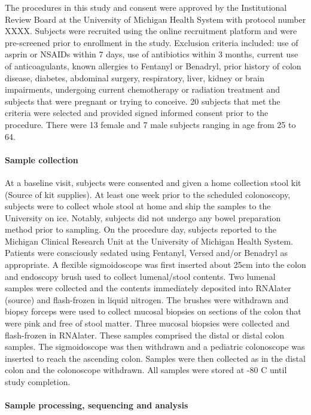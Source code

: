 \documentclass[11pt,]{article}
\let\oldparagraph\paragraph
\renewcommand{\paragraph}[1]{\oldparagraph{#1}\mbox{}}
\begin{document}
The procedures in this study and consent were approved by the
Institutional Review Board at the University of Michigan Health System
with protocol number XXXX. Subjects were recruited using the online
recruitment platform and were pre-screened prior to enrollment in the
study. Exclusion criteria included: use of asprin or NSAIDs within 7
days, use of antibiotics within 3 months, current use of anticoagulants,
known allergies to Fentanyl or Benadryl, prior history of colon disease,
diabetes, abdominal surgery, respiratory, liver, kidney or brain
impairments, undergoing current chemotherapy or radiation treatment and
subjects that were pregnant or trying to conceive. 20 subjects that met
the criteria were selected and provided signed informed consent prior to
the procedure. There were 13 female and 7 male subjects ranging in age
from 25 to 64.

\paragraph{Sample collection}\label{sample-collection}

At a baseline visit, subjects were consented and given a home collection
stool kit (Source of kit supplies). At least one week prior to the
scheduled colonoscopy, subjects were to collect whole stool at home and
ship the samples to the University on ice. Notably, subjects did not
undergo any bowel preparation method prior to sampling. On the procedure
day, subjects reported to the Michigan Clinical Research Unit at the
University of Michigan Health System. Patients were consciously sedated
using Fentanyl, Versed and/or Benadryl as appropriate. A flexible
sigmoidoscope was first inserted about 25cm into the colon and endoscopy
brush used to collect lumenal/stool contents. Two lumenal samples were
collected and the contents immediately deposited into RNAlater (source)
and flash-frozen in liquid nitrogen. The brushes were withdrawn and
biopsy forceps were used to collect mucosal biopsies on sections of the
colon that were pink and free of stool matter. Three mucosal biopsies
were collected and flash-frozen in RNAlater. These samples comprised the
distal or distal colon samples. The sigmoidoscope was then withdrawn and
a pediatric colonoscope was inserted to reach the ascending colon.
Samples were then collected as in the distal colon and the colonoscope
withdrawn. All samples were stored at -80 C until study completion.

\paragraph{Sample processing, sequencing and
analysis}\label{sample-processing-sequencing-and-analysis}
\end{document}
